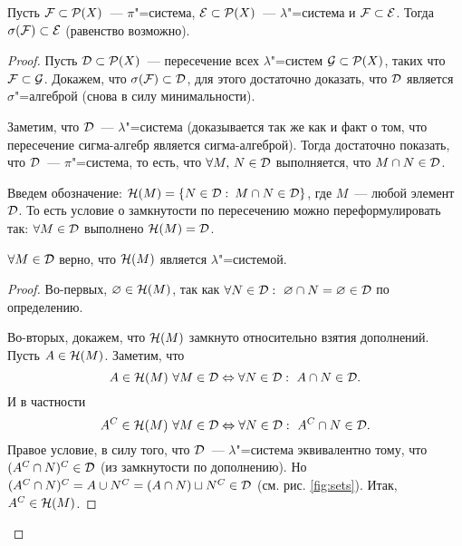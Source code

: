 \begin{theorem}[Дынкин]
    \label{theorem:dynkin}

    Пусть $\mathcal{F} \subset\mathcal{P}(X)$~--- $\pi$"=система, $\mathcal{E}\subset\mathcal{P}(X)$~--- $\lambda$"=система и
    $\mathcal{F} \subset\mathcal{E}$. Тогда $\sigma(\mathcal{F} )\subset\mathcal{E}$ (равенство возможно).

    \begin{proof}
        Пусть $\mathcal{D}\subset \mathcal{P}(X)$~--- пересечение всех $\lambda$"=систем $\mathcal{G}\subset\mathcal{P}(X)$, 
        таких что $\mathcal{F} \subset\mathcal{G}$. Докажем, что $\sigma(\mathcal{F} )\subset\mathcal{D}$, для этого достаточно доказать, 
        что $\mathcal{D}$ является $\sigma$"=алгеброй (снова в силу минимальности).

        Заметим, что $\mathcal{D}$~--- $\lambda$"=система (доказывается так же как и факт о том, что пересечение сигма-алгебр является
        сигма-алгеброй). Тогда достаточно показать, что $\mathcal{D}$~--- $\pi$"=система, то есть, что 
        $\forall M,\, N\in\mathcal{D}$ выполняется, что $M\cap N\in\mathcal{D}$.

        Введем обозначение: $\mathcal{H}(M)=\{N\in\mathcal{D}:\: M\cap N\in\mathcal{D}\}$, где $M$~--- любой элемент $\mathcal{D}$. То есть 
        условие о замкнутости по пересечению можно переформулировать так: $\forall M\in\mathcal{D}$ выполнено $\mathcal{H}(M)=\mathcal{D}$.

        \begin{lemma}
            $\forall M\in\mathcal{D}$ верно, что $\mathcal{H}(M)$ является $\lambda$"=системой.

            \begin{proof}
                Во-первых, $\varnothing\in\mathcal{H}(M)$, так как $\forall N\in\mathcal{D}:\ \varnothing\cap N=\varnothing\in\mathcal{D}$ по определению.

                Во-вторых, докажем, что $\mathcal{H}(M)$ замкнуто относительно взятия дополнений. Пусть $A\in\mathcal{H}(M)$. 
                Заметим, что
                \begin{equation}
                    \label{eq:lemmastate}
                    A\in\mathcal{H}(M)\ \forall M\in\mathcal{D}\Leftrightarrow\forall N\in\mathcal{D}:\ A\cap N\in\mathcal{D}.
                \end{equation}
                И в частности 
                \[
                    A^C\in\mathcal{H}(M)\ \forall M\in\mathcal{D}\Leftrightarrow\forall N\in\mathcal{D}:\ A^C\cap N\in\mathcal{D}.    
                \]
                Правое условие, в силу того, что $\mathcal{D}$~--- $\lambda$"=система эквивалентно тому, что 
                $(A^C\cap N)^C\in\mathcal{D}$ (из замкнутости по дополнению). Но $(A^C\cap N)^C=A\cup N^C=(A\cap N)\sqcup N^C\in\mathcal{D}$ 
                (см. рис. \ref{fig:sets}). Итак, $A^C\in\mathcal{H}(M)$.


\end{proof}
\end{lemma}
\end{proof}
\end{theorem}

